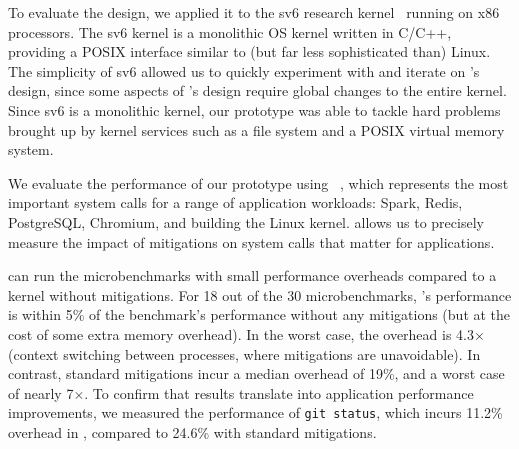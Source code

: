 To evaluate the \sys design, we applied it to the sv6 research
kernel~\cite{clements:sc} running on x86 processors.  The sv6 kernel
is a monolithic OS kernel written in C/C++, providing a POSIX
interface similar to (but far less sophisticated than) Linux.  The
simplicity of sv6 allowed us to quickly experiment with and iterate on
\sys's design, since some aspects of \sys's design require global
changes to the entire kernel.  Since sv6 is a monolithic kernel,
our prototype was able to tackle hard problems brought up by kernel
services such as a file system and a POSIX virtual memory system.

We evaluate the performance of our \sys prototype using
\bench~\cite{lebench}, which represents the most important system calls
for a range of application workloads: Spark, Redis, PostgreSQL,
Chromium, and building the Linux kernel.  \bench allows us to precisely
measure the impact of mitigations on system calls that matter
for applications.

\sys can run the \bench microbenchmarks with small performance
overheads compared to a kernel without mitigations.  For 18 out of
the 30 \bench microbenchmarks, \sys's performance is within 5\% of the
benchmark's performance without any mitigations (but at the cost of some
extra memory overhead).  In the worst case, the overhead is 4.3$\times$
(context switching between processes, where mitigations are unavoidable).
In contrast, standard mitigations incur a median overhead of 19\%, and
a worst case of nearly 7$\times$.  To confirm that \bench results translate
into application performance improvements, we measured the performance
of \texttt{git status}, which incurs 11.2\% overhead in \sys, compared
to 24.6\% with standard mitigations.



